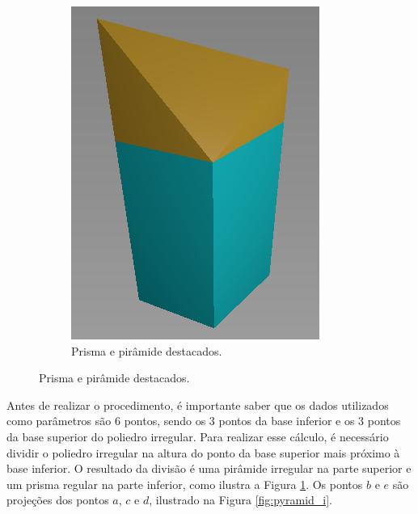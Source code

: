 \begin{figure}[H]
\begin{subfigure}[t]{0.25\textwidth}
        \includegraphics[width=\textwidth]{dados/figuras/pol_sep.png}
        \caption{Prisma e pirâmide destacados.}
        \label{fig:polyhedron3}
    \end{subfigure}
    \label{fig:polyhedron}
\end{figure}

Antes de realizar o procedimento, é importante saber que os dados utilizados como parâmetros são 6 pontos, sendo os 3 pontos da base inferior e os 3 pontos da base superior do poliedro irregular.
Para realizar esse cálculo, é necessário dividir o poliedro irregular na altura do ponto da base superior mais próximo à base inferior.
O resultado da divisão é uma pirâmide irregular na parte superior e um prisma regular na parte inferior, como ilustra a Figura \ref{fig:polyhedron3}.
Os pontos $b$ e $e$ são projeções dos pontos $a$, $c$ e $d$, ilustrado na Figura \ref{fig:pyramid_i}.

